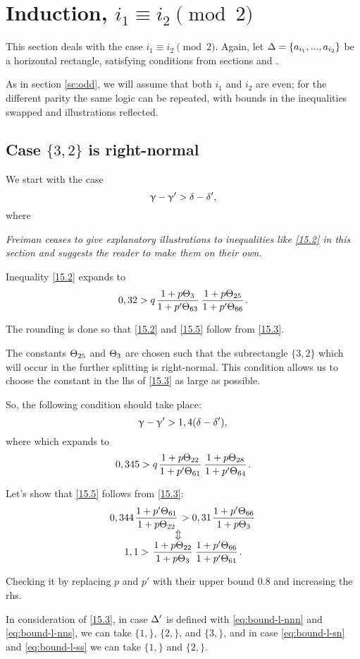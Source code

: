 \section{Induction, $i_1 \equiv i_2 \pmod 2$}

This section deals with the case $i_1 \equiv i_2 \pmod 2$.
Again, let $\Delta = \{ a_{i_1}, ..., a_{i_2}\}$ be a horizontal rectangle,
satisfying conditions from sections  and .

As in section \ref{sc:odd}, we will assume that both $i_1$ and $i_2$ are even;
for the different parity the same logic can be repeated,
with bounds in the inequalities swapped and illustrations reflected.

\subsection{Case $\{3,2\}$ is right-normal}

We start with the case
\begin{equation}\label{15.2}
	\upgamma - \upgamma' > \delta - \delta',
\end{equation}
where

\textit{
	Freiman ceases to give explanatory illustrations to inequalities like \ref{15.2} in this section
	and suggests the reader to make them on their own.
}

Inequality \ref{15.2} expands to
\begin{equation}\label{15.3}
	0,32 > q \up{3}{63} \up{25}{66}.
\end{equation}

The rounding is done so that \ref{15.2} and \ref{15.5} follow from \ref{15.3}.

The constants $\Theta_{25}$ and $\Theta_{3}$ are chosen such that the subrectangle $\{3,2\}$
which will occur in the further splitting is right-normal.
This condition allows us to choose the constant in the lhs of \ref{15.3} as large as possible.

So, the following condition should take place:
\begin{equation}\label{15.4}
	\upgamma - \upgamma' > 1,4(\delta - \delta'),
\end{equation}
where
which expands to
\begin{equation}\label{15.5}
	0,345 > q \up{22}{61} \up{28}{64}.
\end{equation}

Let's show that \ref{15.5} follows from \ref{15.3}:
\begin{gather*}
	0,344 \pu{61}{22} > 0,31 \pu{66}{3}\\
	\ArrowBetweenLines
	1,1 > \uu{22}{3} \pp{66}{61}.
\end{gather*}

Checking it by replacing $p$ and $p'$ with their upper bound 0.8 and increasing the rhs.

In consideration of \ref{15.3},
in case $\Delta'$ is defined with \ref{eq:bound-l-nnn} and \ref{eq:bound-l-nns},
we can take $\{1,\}$, $\{2,\}$, and $\{3,\}$,
and in case \ref{eq:bound-l-sn} and \ref{eq:bound-l-ss}
we can take $\{1,\}$ and $\{2,\}$.


